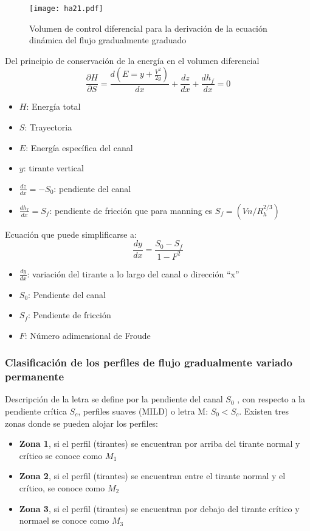 \begin{figure}[h!]
\centering
  \texttt{[image: ha21.pdf]}
  \caption{Volumen de control diferencial para la derivación de la ecuación dinámica del flujo gradualmente graduado}
  \label{ha21}
\end{figure}
Del principio de conservación de la energía en el volumen diferencial
\begin{equation}
    \frac{\partial H}{\partial S} = \frac{d\left(E = y + \frac{V^2}{2g} \right)}{dx} + \frac{dz}{dx} + \frac{dh_f}{dx} =0
\end{equation}
\begin{notation}
    \begin{itemize}
        \item $H$: Energía total
        \item $S$: Trayectoria
        \item $E$: Energía específica del canal
        \item $y$: tirante vertical
        \item $\frac{dz}{dx}=-S_0$: pendiente del canal
        \item $\frac{dh_f}{dx}=S_f$: pendiente de fricción que para manning es $S_f=\left(Vn/R_h^{2/3}\right)$
    \end{itemize}
\end{notation}
Ecuación que puede simplificarse a:
\begin{equation}
    \frac{dy}{dx} = \frac{S_0 -S_f}{1 - F^2}
\end{equation}
\begin{notation}
    \begin{itemize}
        \item $\frac{dy}{dx}$: variación del tirante a lo largo del canal o dirección ``x''
        \item $S_0$: Pendiente del canal
        \item $S_f$: Pendiente de fricción
        \item $F$: Número adimensional de Froude
    \end{itemize}
\end{notation}
\subsubsection{Clasificación de los perfiles de flujo gradualmente variado permanente}
Descripción de la letra se define por la pendiente del canal $S_0$ , con respecto a la pendiente crítica $S_c$, perfiles suaves (MILD) o letra M: $S_0<S_c$. Existen tres zonas donde se pueden alojar los perfiles:
\begin{itemize}
    \item \textbf{Zona 1}, si el perfil (tirantes) se encuentran por arriba del tirante normal y crítico se conoce como $M_1$
    \item \textbf{Zona 2}, si el perfil (tirantes) se encuentran entre el tirante normal y el crítico, se conoce como $M_2$
    \item \textbf{Zona 3}, si el perfil (tirantes) se encuentran por debajo del tirante crítico y normael se conoce como $M_3$
\end{itemize}

